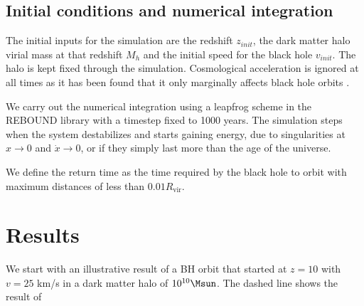 \documentclass[fleqn,usenatbib]{mnras}
\begin{document}
\subsection{Initial conditions and numerical integration}

The initial inputs for the simulation are the redshift $z_{init}$, the dark matter halo virial mass at that redshift $M_{h}$ and the initial speed for the black hole $v_{init}$. 
The halo is kept fixed through the simulation. Cosmological acceleration is ignored at all times as it has been found that it only marginally affects black hole orbits \citep{choksi2017recoiling}. 

We carry out the numerical integration  using a leapfrog scheme in the REBOUND library with a timestep fixed to 1000 years.
The simulation steps when the system destabilizes and starts gaining energy, due to singularities at $x \rightarrow 0$ and $\dot{x} \rightarrow 0$, or if they simply last more than the age of the universe. 
		
We define the return time as the time required by the black hole to orbit with maximum distances of less than  $0.01R_\text{vir}$.
		

\section{Results}

We start with an illustrative result of a BH orbit that started at $z=10$ with $v=25$ km/s in a dark matter halo of $10^{10}\Msun$.
The dashed line shows the result of 








\appendix

\bsp	%
\label{lastpage}
\end{document}
